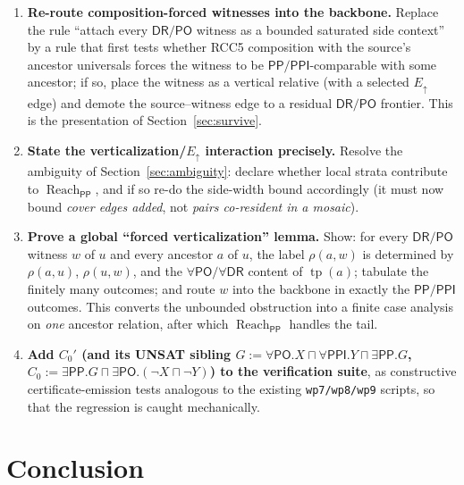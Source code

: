\documentclass[11pt]{article}
\newcommand{\DR}{\mathsf{DR}}
\newcommand{\PO}{\mathsf{PO}}
\newcommand{\PP}{\mathsf{PP}}
\newcommand{\PPI}{\mathsf{PPI}}
\newcommand{\reach}{\operatorname{Reach}}
\newcommand{\tp}{\operatorname{tp}}
\newcommand{\Eup}{E_{\uparrow}}
\begin{document}
\begin{enumerate}[label=R\arabic*.]
\item \textbf{Re-route composition-forced witnesses into the backbone.}  Replace
the rule ``attach every $\DR/\PO$ witness as a bounded saturated side context''
by a rule that first tests whether RCC5 composition with the source's ancestor
universals forces the witness to be $\PP/\PPI$-comparable with some ancestor; if
so, place the witness as a vertical relative (with a selected $\Eup$ edge) and
demote the source--witness edge to a residual $\DR/\PO$ frontier.  This is the
presentation of Section~\ref{sec:survive}.

\item \textbf{State the verticalization/$\Eup$ interaction precisely.}  Resolve
the ambiguity of Section~\ref{sec:ambiguity}: declare whether local strata
contribute to $\reach_{\PP}$, and if so re-do the side-width bound accordingly
(it must now bound \emph{cover edges added}, not \emph{pairs co-resident in a
mosaic}).

\item \textbf{Prove a global ``forced verticalization'' lemma.}  Show: for every
$\DR/\PO$ witness $w$ of $u$ and every ancestor $a$ of $u$, the label
$\rho(a,w)$ is determined by $\rho(a,u)$, $\rho(u,w)$, and the $\forall\PO/\forall\DR$
content of $\tp(a)$; tabulate the finitely many outcomes; and route $w$ into the
backbone in exactly the $\PP/\PPI$ outcomes.  This converts the unbounded
obstruction into a finite case analysis on \emph{one} ancestor relation, after
which $\reach_{\PP}$ handles the tail.

\item \textbf{Add $C_0'$ (and its UNSAT sibling
$G:=\forall\PO.X\sqcap\forall\PPI.Y\sqcap\exists\PP.G$,
$C_0:=\exists\PP.G\sqcap\exists\PO.(\neg X\sqcap\neg Y)$) to the verification
suite}, as constructive certificate-emission tests analogous to the existing
\texttt{wp7/wp8/wp9} scripts, so that the regression is caught mechanically.
\end{enumerate}

\section{Conclusion}
\end{document}
